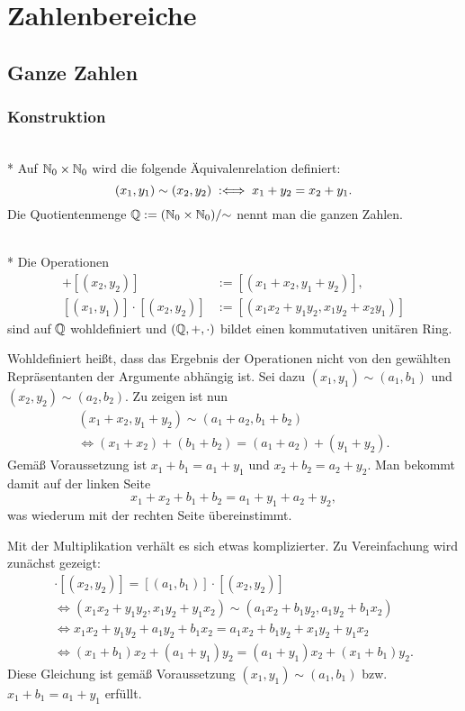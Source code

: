 
\chapter{Zahlenbereiche}

\section{Ganze Zahlen}

\subsection{Konstruktion}

\begin{Definition}\mbox{}\\*
Auf $\mathbb N_0\times\mathbb N_0$ wird die folgende Äquivalenrelation definiert:
\[(x_1,y_1)\sim (x_2,y_2) \;:\Longleftrightarrow\; x_1+y_2 = x_2+y_1.\]
Die Quotientenmenge $\mathbb Q := (\mathbb N_0\times\mathbb N_0)/{\sim}$ nennt man
die ganzen Zahlen.
\end{Definition}

\begin{Satz}\mbox{}\\*
Die Operationen
\begin{align*}
[(x_1,y_1)]+[(x_2,y_2)] &:= [(x_1+x_2,y_1+y_2)],\\
[(x_1,y_1)]\cdot [(x_2,y_2)] &:= [(x_1x_2+y_1y_2,x_1y_2+x_2y_1)]
\end{align*}
sind auf $\mathbb Q$ wohldefiniert und $(\mathbb Q,+,\cdot)$ bildet einen
kommutativen unitären Ring.
\end{Satz}
 Wohldefiniert heißt, dass das Ergebnis der Operationen
nicht von den gewählten Repräsentanten der Argumente abhängig ist.
Sei dazu $(x_1,y_1)\sim(a_1,b_1)$ und
$(x_2,y_2)\sim (a_2,b_2)$. Zu zeigen ist nun
\begin{gather*}
(x_1+x_2,y_1+y_2)\sim (a_1+a_2,b_1+b_2)\\
\iff (x_1+x_2)+(b_1+b_2) = (a_1+a_2)+(y_1+y_2).
\end{gather*}
Gemäß Voraussetzung ist $x_1+b_1=a_1+y_1$ und $x_2+b_2=a_2+y_2$.
Man bekommt damit auf der linken Seite
\[x_1+x_2+b_1+b_2 = a_1+y_1+a_2+y_2,\]
was wiederum mit der rechten Seite übereinstimmt.

Mit der Multiplikation verhält es sich etwas komplizierter.
Zu Vereinfachung wird zunächst gezeigt:
\begin{gather*}
[(x_1,y_1)]\cdot [(x_2,y_2)] = [(a_1,b_1)]\cdot [(x_2,y_2)]\\
\iff (x_1x_2+y_1y_2,x_1y_2+y_1x_2)\sim (a_1x_2+b_1y_2,a_1y_2+b_1x_2)\\
\iff x_1x_2+y_1y_2 + a_1y_2+b_1x_2 = a_1x_2+b_1y_2 + x_1y_2+y_1x_2\\
\iff (x_1+b_1)x_2 + (a_1+y_1)y_2 = (a_1+y_1)x_2 + (x_1+b_1)y_2.
\end{gather*}
Diese Gleichung ist gemäß Voraussetzung $(x_1,y_1)\sim (a_1,b_1)$
bzw. $x_1+b_1=a_1+y_1$ erfüllt.

